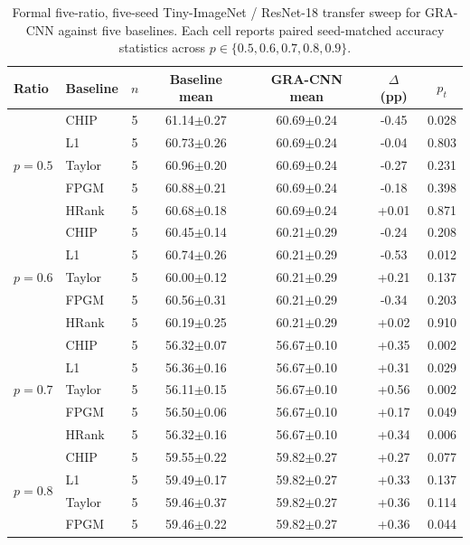 \begin{table}[t]
\caption{Formal five-ratio, five-seed Tiny-ImageNet / ResNet-18 transfer sweep for GRA-CNN against five baselines. Each cell reports paired seed-matched accuracy statistics across $p\in\{0.5,0.6,0.7,0.8,0.9\}$.}
\label{tab:cross_dataset}
\scriptsize
\setlength{\tabcolsep}{3.3pt}
\begin{tabular*}{\textwidth}{@{\extracolsep\fill}llccccc}
\toprule
Ratio & Baseline & $n$ & Baseline mean & GRA-CNN mean & $\Delta$ (pp) & $p_t$ \\
\midrule
\multirow{5}{*}{$p=0.5$} & CHIP & 5 & 61.14$\pm$0.27 & 60.69$\pm$0.24 & -0.45 & 0.028 \\
 & L1 & 5 & 60.73$\pm$0.26 & 60.69$\pm$0.24 & -0.04 & 0.803 \\
 & Taylor & 5 & 60.96$\pm$0.20 & 60.69$\pm$0.24 & -0.27 & 0.231 \\
 & FPGM & 5 & 60.88$\pm$0.21 & 60.69$\pm$0.24 & -0.18 & 0.398 \\
 & HRank & 5 & 60.68$\pm$0.18 & 60.69$\pm$0.24 & +0.01 & 0.871 \\
\midrule
\multirow{5}{*}{$p=0.6$} & CHIP & 5 & 60.45$\pm$0.14 & 60.21$\pm$0.29 & -0.24 & 0.208 \\
 & L1 & 5 & 60.74$\pm$0.26 & 60.21$\pm$0.29 & -0.53 & 0.012 \\
 & Taylor & 5 & 60.00$\pm$0.12 & 60.21$\pm$0.29 & +0.21 & 0.137 \\
 & FPGM & 5 & 60.56$\pm$0.31 & 60.21$\pm$0.29 & -0.34 & 0.203 \\
 & HRank & 5 & 60.19$\pm$0.25 & 60.21$\pm$0.29 & +0.02 & 0.910 \\
\midrule
\multirow{5}{*}{$p=0.7$} & CHIP & 5 & 56.32$\pm$0.07 & 56.67$\pm$0.10 & +0.35 & 0.002 \\
 & L1 & 5 & 56.36$\pm$0.16 & 56.67$\pm$0.10 & +0.31 & 0.029 \\
 & Taylor & 5 & 56.11$\pm$0.15 & 56.67$\pm$0.10 & +0.56 & 0.002 \\
 & FPGM & 5 & 56.50$\pm$0.06 & 56.67$\pm$0.10 & +0.17 & 0.049 \\
 & HRank & 5 & 56.32$\pm$0.16 & 56.67$\pm$0.10 & +0.34 & 0.006 \\
\midrule
\multirow{5}{*}{$p=0.8$} & CHIP & 5 & 59.55$\pm$0.22 & 59.82$\pm$0.27 & +0.27 & 0.077 \\
 & L1 & 5 & 59.49$\pm$0.17 & 59.82$\pm$0.27 & +0.33 & 0.137 \\
 & Taylor & 5 & 59.46$\pm$0.37 & 59.82$\pm$0.27 & +0.36 & 0.114 \\
 & FPGM & 5 & 59.46$\pm$0.22 & 59.82$\pm$0.27 & +0.36 & 0.044 \\

\end{tabular*}
\end{table}
